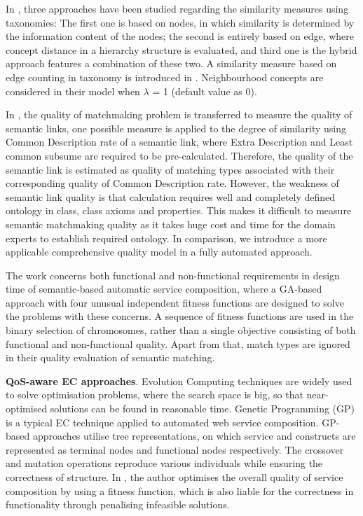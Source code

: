 \documentclass{llncs}
\begin{document}
In \cite{shet2012new}, three approaches have been studied regarding the similarity measures using taxonomies: The first one is based on nodes, in which similarity is determined by the information content of the nodes; the second is entirely based on edge, where concept distance in a hierarchy structure is evaluated, and third one is the hybrid approach features a combination of these two. A similarity measure based on edge counting in taxonomy is introduced in \cite{shet2012new}. Neighbourhood concepts are considered in their model when $\lambda$ = 1 (default value as 0).

In \cite{lecue2009optimizing}, the quality of matchmaking problem is transferred to measure the quality of semantic links, one possible measure is applied to the degree of similarity using Common Description rate of a semantic link, where Extra Description and Least common subsume are required to be pre-calculated. Therefore, the quality of the semantic link is estimated as quality of matching types associated with their corresponding quality of Common Description rate. However, the weakness of semantic link quality is that calculation requires well and completely defined ontology in class, class axioms and properties. This makes it difficult to measure semantic matchmaking quality as it takes huge cost and time for the domain experts to establish required ontology. In comparison, we introduce a more applicable comprehensive quality model in a fully automated approach.

The work \cite{fanjiang2014semantic} concerns both functional and non-functional requirements in design time of semantic-based automatic service composition, where a GA-based approach with four unusual independent fitness functions are designed to solve the problems with these concerns. A sequence of fitness functions are used in the binary selection of chromosomes, rather than a single objective consisting of both functional and non-functional quality. Apart from that, match types are ignored in their quality evaluation of semantic matching.

\textbf{QoS-aware EC approaches}. Evolution Computing techniques are widely used to solve optimisation problems, where the search space is big, so that near-optimised solutions can be found in reasonable time. Genetic Programming (GP) \cite{da2016particle,da2015graphevol} is a typical EC technique applied to automated web service composition. GP-based approaches utilise tree representations, on which service and constructs are represented as terminal nodes and functional nodes respectively. The crossover and mutation operations reproduce various individuals while ensuring the correctness of structure. In \cite{yu2013adaptive}, the author optimises the overall quality of service composition by using a fitness function, which is also liable for the correctness in functionality through penalising infeasible solutions. 
\end{document}
